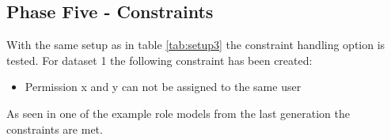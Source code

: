 \newpage
\subsection{Phase Five - Constraints}
\label{sec:phase5}
With the same setup as in table \ref{tab:setup3} the constraint handling option is tested. For dataset 1 the following constraint has been created:
\begin{itemize}
    \item Permission x and y can not be assigned to the same user
\end{itemize}
As seen in one of the example role models from the last generation the constraints are met.

